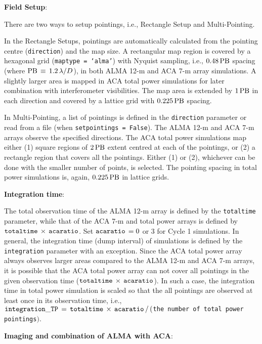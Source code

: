 \medskip
{\bf Field Setup}:

There are two ways to setup pointings, i.e., Rectangle Setup and
Multi-Pointing.

In the Rectangle Setups, pointings are automatically calculated from
the pointing centre ({\tt direction}) and the map size.
A rectangular map region is covered by a hexagonal grid
({\tt maptype = `alma'}) with Nyquist sampling, i.e.,
$ 0.48\, {\rm PB} $ spacing (where
$ {\rm PB} \, \equiv \, 1.2 \, \lambda / D $), 
in both ALMA 12-m and ACA 7-m array simulations.
A slightly larger area is mapped in ACA total 
power simulations for later combination with interferometer 
visibilities. The map area is extended by $ 1 \, {\rm PB} $
in each direction and
covered by a lattice grid with $ 0.225\, {\rm PB} $ spacing.

In Multi-Pointing, a list of pointings is
defined in the {\tt direction} parameter or read from a file (when
{\tt setpointings = False}). The ALMA 12-m and ACA 7-m arrays observe
the specified directions.
The ACA total power simulations map either
(1) square regions of $ 2\, {\rm PB} $ extent centred at each of the
pointings, or 
(2) a rectangle region that covers all the pointings.
Either (1) or (2), whichever can be done with the smaller
number of points, is selected. The pointing spacing in total power
simulations is, again, $  0.225\, {\rm PB} $ in lattice grids.


\medskip
{\bf Integration time}:

The total observation time of the ALMA 12-m array is defined by the
{\tt totaltime} parameter, while that of the ACA 7-m and total power
arrays is defined by $ {\tt totaltime} \, \times \, {\tt acaratio} $.
Set $ {\tt acaratio} \, = 0 $ or $ 3 $ for Cycle 1 simulations.
In general, the integration time (dump interval) of simulations is
defined by the {\tt integration} parameter with an exception.
Since the ACA total power array always observes larger areas compared
to the ALMA 12-m and ACA 7-m arrays, it is possible that the ACA total power array
can not cover all pointings in the given observation time 
($ {\tt totaltime} \, \times \, {\tt acaratio} $). 
In such a case, the integration time in total power simulation is scaled
so that the all pointings are observed at least once in its
observation time, i.e., 
${\tt integration\_TP} \, = \, {\tt totaltime} \, \times \, {\tt acaratio}
\, / \, ( ${\tt the number of total power pointings}$ ) $.


\medskip
{\bf Imaging and combination of ALMA with ACA}:

